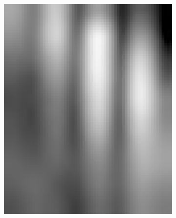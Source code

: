 \begin{figure}[h!]
	\begin{subfigure}{0.22\textwidth}
		\includegraphics[width=\linewidth]{Images/KDDProcess/fifthFilter}
		\caption{}    %
		\label{subfig:fifthFilter}
	\end{subfigure}
	\hfill
	\begin{subfigure}{0.22\textwidth}

\end{subfigure}
\end{figure}
